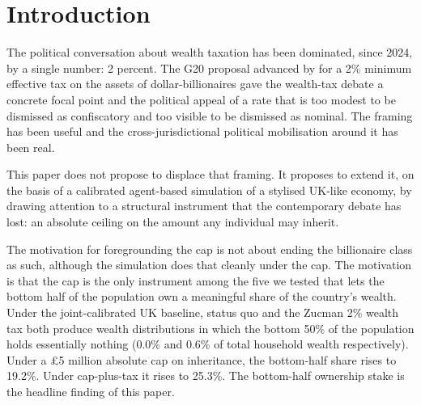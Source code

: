 \documentclass[11pt]{article}
\begin{document}
\begin{abstract}
The model and data release are documented in companion technical
submissions to JEIC, JASSS, and Artificial Life.  This paper
foregrounds the fiscal-policy implication and recommends a
\pounds 5--10M cap, internationally coordinated at the G20 level,
with residency-clock and exit-tax provisions and explicit
carve-outs for primary residences and small productive-business
assets.  The end of the billionaire class is the visible side
effect of this proposal.  The proposal itself is about ownership.
\end{abstract}

\section{Introduction}

The political conversation about wealth taxation has been dominated,
since 2024, by a single number: 2 percent.  The G20 proposal advanced
by \citet{zucman2024global} for a 2\% minimum effective tax on the
assets of dollar-billionaires gave the wealth-tax debate a concrete
focal point and the political appeal of a rate that is too modest to
be dismissed as confiscatory and too visible to be dismissed as
nominal.  The framing has been useful and the cross-jurisdictional
political mobilisation around it has been real.

This paper does not propose to displace that framing.  It proposes
to extend it, on the basis of a calibrated agent-based simulation
of a stylised UK-like economy, by drawing attention to a structural
instrument that the contemporary debate has lost: an absolute ceiling
on the amount any individual may inherit.

The motivation for foregrounding the cap is not about ending the
billionaire class as such, although the simulation does that
cleanly under the cap.  The motivation is that the cap is the only
instrument among the five we tested that lets the bottom half of
the population own a meaningful share of the country's wealth.
Under the joint-calibrated UK baseline, status quo and the Zucman
2\% wealth tax both produce wealth distributions in which the
bottom 50\% of the population holds essentially nothing (0.0\% and
0.6\% of total household wealth respectively).  Under a \pounds 5
million absolute cap on inheritance, the bottom-half share rises
to 19.2\%.  Under cap-plus-tax it rises to 25.3\%.  The bottom-half
ownership stake is the headline finding of this paper.
\end{document}
